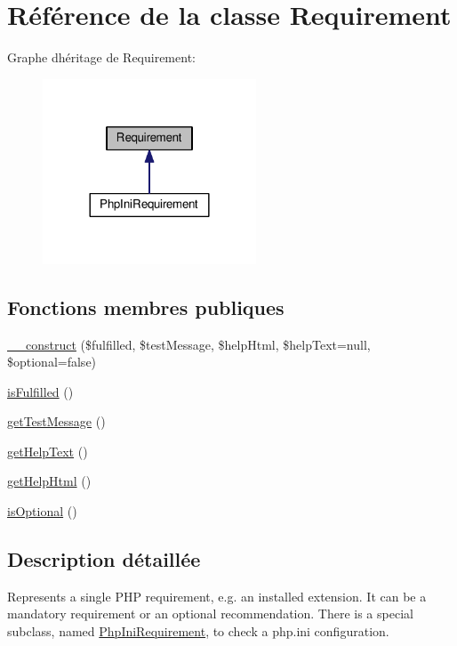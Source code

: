 \hypertarget{classRequirement}{}\section{Référence de la classe Requirement}
\label{classRequirement}


Graphe d\textquotesingle{}héritage de Requirement\+:\nopagebreak
\begin{figure}[H]
\begin{center}
\leavevmode
\includegraphics[width=180pt]{classRequirement__inherit__graph}
\end{center}
\end{figure}
\subsection*{Fonctions membres publiques}
\begin{DoxyCompactItemize}
\item 
\hyperlink{classRequirement_aed1695de1426aa5912a889bd93b66c83}{\+\_\+\+\_\+construct} (\$fulfilled, \$test\+Message, \$help\+Html, \$help\+Text=null, \$optional=false)
\item 
\hyperlink{classRequirement_aba605020ffa080b4d5b7217fc42822f0}{is\+Fulfilled} ()
\item 
\hyperlink{classRequirement_ac4cc7cb836c9e0c11018cef57a0fbc4d}{get\+Test\+Message} ()
\item 
\hyperlink{classRequirement_a6de91d308edfd46aada84b2faa16db01}{get\+Help\+Text} ()
\item 
\hyperlink{classRequirement_ad1ba7e3c3a6b1e94877d0d9ed66643dd}{get\+Help\+Html} ()
\item 
\hyperlink{classRequirement_a2e42f150791b2995f18048c7b21c7805}{is\+Optional} ()
\end{DoxyCompactItemize}


\subsection{Description détaillée}
Represents a single P\+HP requirement, e.\+g. an installed extension. It can be a mandatory requirement or an optional recommendation. There is a special subclass, named \hyperlink{classPhpIniRequirement}{Php\+Ini\+Requirement}, to check a php.\+ini configuration.

